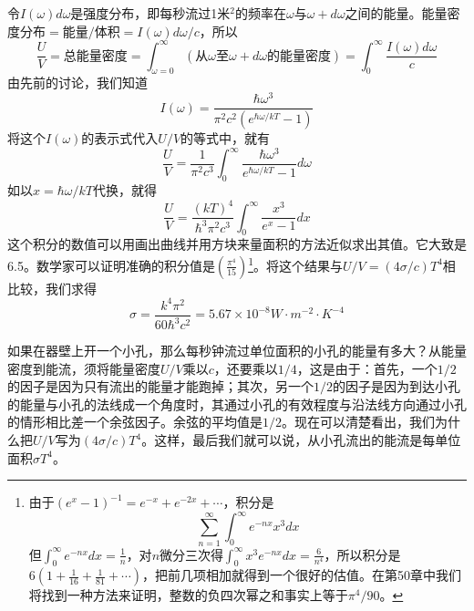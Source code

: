 令$I(\omega)d\omega$是强度分布，即每秒流过1米$^2$的频率在$\omega$与$\omega +d\omega$之间的能量。能量密度分布$=\text{能量}/\text{体积}=I(\omega)d\omega/ c$，所以
\begin{equation*}
    \frac{U}{V} = \text{总能量密度} = \int_{\omega=0}^\infty(\text{从$\omega$至$\omega + d\omega$的能量密度}) = \int_0^\infty \frac{I(\omega)d\omega}{c}
\end{equation*}
由先前的讨论，我们知道
\begin{equation*}
    I(\omega) = \frac{\hbar\omega^3}{\pi^2c^2(e^{\hbar\omega/kT} - 1)}
\end{equation*}
将这个$I(\omega)$的表示式代入$U/V$的等式中，就有
\begin{equation*}
    \frac{U}{V}=\frac{1}{\pi^2c^3}\int^\infty_0 \frac{\hbar\omega^3}{e^{\hbar\omega/kT} - 1}d\omega
\end{equation*}
如以$x=\hbar\omega/kT$代换，就得
\begin{equation*}
    \frac{U}{V}=\frac{(kT)^4}{\hbar^3\pi^2c^3}\int_0^\infty \frac{x^3}{e^x-1}dx
\end{equation*}
这个积分的数值可以用画出曲线并用方块来量面积的方法近似求出其值。它大致是6.5。数学家可以证明准确的积分值是$\left(\frac{\pi^4}{15}\right)$\footnote{
    由于$(e^x -1)^{-1} =e^{-x} +e^{-2x} +\cdots$，积分是\begin{equation*}
        \sum_{n=1}^{\infty}\int_0^\infty e^{-nx}x^3dx
    \end{equation*}但$\int_0^\infty e^{-nx}dx=\frac{1}{n}$，对$n$微分三次得$\int_0^\infty x^3e^{-nx}dx=\frac{6}{n^4}$，所以积分是$6\left(1+\frac{1}{16}+\frac{1}{81}+\cdots\right)$，把前几项相加就得到一个很好的估值。在第50章中我们将找到一种方法来证明，整数的负四次幂之和事实上等于$\pi^4/90$。
}。将这个结果与$U/V =(4\sigma /c)T^4$相比较，我们求得
\begin{equation*}
    \sigma = \frac{k^4\pi^2}{60\hbar^3c^2} = 5.67\times 10^{-8} W\cdot m^{-2}\cdot K^{-4}
\end{equation*}

如果在器壁上开一个小孔，那么每秒钟流过单位面积的小孔的能量有多大？从能量密度到能流，须将能量密度$U/V$乘以$c$，还要乘以$1/4$，这是由于：首先，一个$1/2$的因子是因为只有流出的能量才能跑掉；其次，另一个$1/2$的因子是因为到达小孔的能量与小孔的法线成一个角度时，其通过小孔的有效程度与沿法线方向通过小孔的情形相比差一个余弦因子。余弦的平均值是$1/2$。现在可以清楚看出，我们为什么把$U/V$写为$(4\sigma/c)T^4$。这样，最后我们就可以说，从小孔流出的能流是每单位面积$\sigma T^4$。